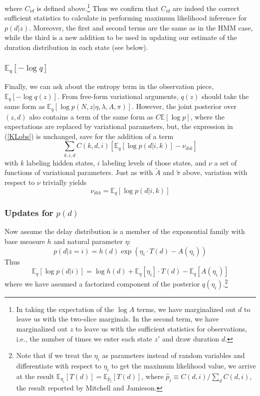 \documentclass[11pt]{article}
\begin{document}
where $C_{id}$ is defined above.\footnote{In taking the expectation of the $\log A$ terms, we have marginalized out $d$ to leave us with the two-slice marginals. In the second term, we have marginalized out $z$ to leave us with the sufficient statistics for observations, i.e., the number of times we enter each state $z'$ and draw duration $d$.} Thus we confirm that $C_{id}$ are indeed the correct sufficient statistics to calculate in performing maximum likelihood inference for $p(d|z)$. Moreover, the first and second terms are the same as in the HMM case, while the third is a new addition to be used in updating our estimate of the duration distribution in each state (see below).

\subsubsection{$\mathbb{E}_q[-\log q]$}
Finally, we can ask about the entropy term in the observation piece, $\mathbb{E}_q[-\log q(z)]$. From free-form variational arguments, $q(z)$ should take the same form as $\mathbb{E}_q[\log p(N, z|\eta, \lambda, A, \pi)]$. However, the joint posterior over $(z, d)$ also contains a term of the same form as $C \mathbb{E}[\log p]$, where the expectations are replaced by variational parameters, but, the expression in (\ref{KLobs}) is unchanged, save for the addition of a term
\begin{equation}
    \sum_{k, i, d} C(k, d, i) [\mathbb{E}_q\left[ \log p(d|i, k) \right]
    - \nu_{dik} ]
\end{equation}
with $k$ labeling hidden states, $i$ labeling levels of those states, and $\nu$ a set of functions of variational parameters. Just as with $\tilde{A}$ and $\tilde{\pi}$ above, variation with respect to $\nu$ trivially yields
\begin{equation}
     \nu_{dik} = \mathbb{E}_q[\log p(d|i, k)]
 \end{equation}

\subsubsection{Updates for $p(d)$}
Now assume the delay distribution is a member of the exponential family with base measure $h$ and natural parameter $\eta$:
\begin{equation}
    p(d|z=i) = h(d) \exp(\eta_i \cdot T(d) - A(\eta_i))
\end{equation}
Thus
\begin{equation}
    \mathbb{E}_q[\log p(d|i)] = \log h(d) + \mathbb{E}_q[\eta_i] \cdot T(d) -
    \mathbb{E}_q[A(\eta_i)]
\end{equation}
where we have assumed a factorized component of the posterior $q(\eta_i)$.\footnote{Note that if we treat the $\eta_i$ as parameters instead of random variables and differentiate with respect to $\eta_i$ to get the maximum likelihood value, we arrive at the result $\mathbb{E}_{\eta_i}[T(d)] = \mathbb{E}_{\hat{p}_i}[T(d)]$, where $\hat{p}_i \equiv C(d, i) / \sum_d C(d, i)$, the result reported by Mitchell and Jamieson.}
\end{document}
